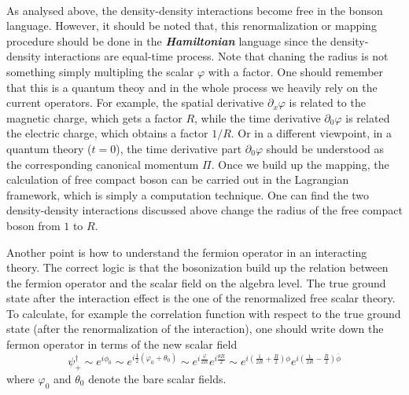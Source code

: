 \documentclass[submission, PhysLectNotes]{SciPost}
\begin{document}
 \\
As analysed above, the density-density interactions become free in the bonson language.
However, it should be noted that, this renormalization or mapping procedure should be 
done in the \textbf{\textit{Hamiltonian}} language since the density-density
interactions are equal-time process. Note that chaning the radius is not something
simply multipling the scalar $\varphi$ with a factor. One should remember that this is
a quantum theoy and in the whole process we heavily rely on the current operators. For 
example, the spatial derivative $\partial_x \varphi$ is related to the magnetic charge, 
which gets a factor $R$, while the time derivative $\partial_0\varphi$ is related the 
electric charge, which obtains a factor $1/R$. Or in a different viewpoint, in a 
quantum theory ($t=0$), the time derivative part $\partial_0\varphi$ should be 
understood as the corresponding canonical momentum $\Pi$. Once we build up the 
mapping, the calculation of free compact boson can be carried out in the Lagrangian 
framework, which is simply a computation technique. One can find the two 
density-density interactions discussed above change the radius of the free compact 
boson from $1$ to $R$. 

Another point is how to understand the fermion operator in an interacting theory. The correct logic is that the bosonization build up the relation between the fermion operator and the scalar field on the algebra level. The true ground state after the interaction effect is the one of the renormalized free scalar theory. To calculate, for example the correlation function with respect to the true ground state (after the renormalization of the interaction), one should write down the fermon operator in terms of the new scalar field 
\begin{equation}
	\psi_{+}^\dagger \sim e^{i\phi_0} \sim e^{i\frac{1}{2} \left(\varphi_0+\theta_0\right)} \sim e^{i\frac{\varphi}{2R}}e^{i\frac{\theta R}{2}} \sim e^{i\left(\frac{1}{2R}+\frac{R}{2}\right)\phi}e^{i\left(\frac{1}{2R}-\frac{R}{2}\right)\overline{\phi}}
\end{equation} 
where $\varphi_0$ and $\theta_0$ denote the bare scalar fields.
\end{document}
